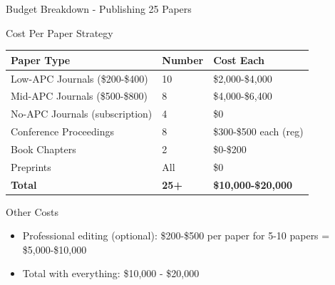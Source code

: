 \documentclass[11pt]{beamer}
\begin{document}
	\begin{frame}{Budget Breakdown - Publishing 25 Papers}
		\scriptsize
		\begin{block}{Cost Per Paper Strategy}
			\centering
			\begin{tabular}{|p{4cm}|p{3cm}|p{3cm}|}
				\hline
				\textbf{Paper Type} & \textbf{Number} & \textbf{Cost Each} \\
				\hline
				Low-APC Journals (\$200-\$400) & 10 & \$2,000-\$4,000 \\
				\hline
				Mid-APC Journals (\$500-\$800) & 8 & \$4,000-\$6,400 \\
				\hline
				No-APC Journals (subscription) & 4 & \$0 \\
				\hline
				Conference Proceedings & 8 & \$300-\$500 each (reg) \\
				\hline
				Book Chapters & 2 & \$0-\$200 \\
				\hline
				Preprints & All & \$0 \\
				\hline
				\textbf{Total} & \textbf{25+} & \textbf{\$10,000-\$20,000} \\
				\hline
			\end{tabular}
		\end{block}
		\begin{block}{Other Costs}
			\begin{itemize}
				\item Professional editing (optional): \$200-\$500 per paper for 5-10 papers = \$5,000-\$10,000
				\item Total with everything: \$10,000 - \$20,000
			\end{itemize}
		\end{block}
	\end{frame}
	
\end{document}
